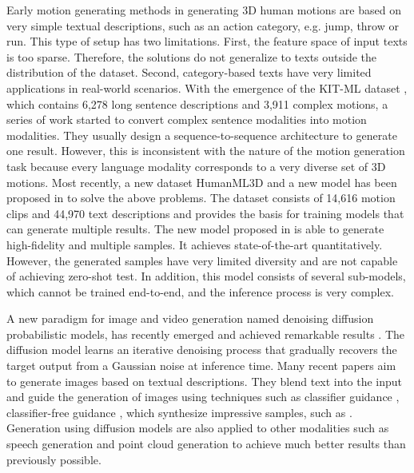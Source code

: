\documentclass{article}
\begin{document}
Early motion generating methods \cite{guo2020action2motion, cai2018deep, tulyakov2018mocogan, petrovich2021action} in generating 3D human motions are based on very simple textual descriptions, such as an action category, e.g. jump, throw or run. This type of setup has two limitations. First, the feature space of input texts is too sparse. Therefore, the solutions do not generalize to texts outside the distribution of the dataset. Second, category-based texts have very limited applications in real-world scenarios. With the emergence of the KIT-ML dataset \cite{plappert2016kit}, which contains 6,278 long sentence descriptions and 3,911 complex motions, a series of work \cite{ahuja2019language2pose, ghosh2021synthesis} started to convert complex sentence modalities into motion modalities. They usually design a sequence-to-sequence architecture to generate one result. However, this is inconsistent with the nature of the motion generation task because every language modality corresponds to a very diverse set of 3D motions. Most recently, a new dataset HumanML3D and a new model has been proposed in \cite{guo2022generating} to solve the above problems. The dataset consists of 14,616 motion clips and 44,970 text descriptions and provides the basis for training models that can generate multiple results. The new model proposed in \cite{guo2022generating} is able to generate high-fidelity and multiple samples. It achieves state-of-the-art quantitatively. However, the generated samples have very limited diversity and are not capable of achieving zero-shot test. In addition, this model consists of several sub-models, which cannot be trained end-to-end, and the inference process is very complex.

A new paradigm for image and video generation named denoising diffusion probabilistic models, has recently emerged and achieved remarkable results \cite{ho2020denoising, song2020denoising}. The diffusion model learns an iterative denoising process that gradually recovers the target output from a Gaussian noise at inference time. Many recent papers aim to generate images based on textual descriptions. They blend text into the input and guide the generation of images using techniques such as classifier guidance \cite{dhariwal2021diffusion}, classifier-free guidance \cite{ho2022classifier}, which synthesize impressive samples, such as \cite{ramesh2022hierarchical}. Generation using diffusion models are also applied to other modalities such as speech generation \cite{kong2020diffwave} and point cloud generation \cite{luo2021diffusion} to achieve much better results than previously possible.
\end{document}
